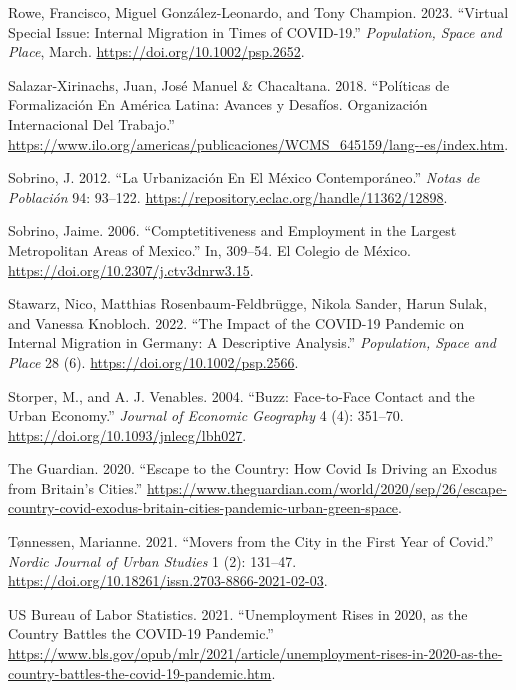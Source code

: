 \documentclass[11pt,letterpaper]{article}
\newlength{\cslhangindent}
\newlength{\cslentryspacingunit} %
\newenvironment{CSLReferences}[2] %
 {%
  \setlength{\parindent}{0pt}
  \ifodd #1
  \let\oldpar\par
  \def\par{\hangindent=\cslhangindent\oldpar}
  \fi
  \setlength{\parskip}{#2\cslentryspacingunit}
 }%
 {}
\begin{document}
\begin{CSLReferences}{1}{0}
\leavevmode{}%
Rowe, Francisco, Miguel González-Leonardo, and Tony Champion. 2023.
{``Virtual Special Issue: Internal Migration in Times of COVID{-}19.''}
\emph{Population, Space and Place}, March.
\url{https://doi.org/10.1002/psp.2652}.

\leavevmode{}%
Salazar-Xirinachs, Juan, José Manuel \& Chacaltana. 2018. {``Políticas
de Formalización En América Latina: Avances y Desafíos. Organización
Internacional Del Trabajo.''}
\url{https://www.ilo.org/americas/publicaciones/WCMS_645159/lang--es/index.htm}.

\leavevmode{}%
Sobrino, J. 2012. {``La Urbanización En El México Contemporáneo.''}
\emph{Notas de Población} 94: 93--122.
\url{https://repository.eclac.org/handle/11362/12898}.

\leavevmode{}%
Sobrino, Jaime. 2006. {``Comptetitiveness and Employment in the Largest
Metropolitan Areas of Mexico.''} In, 309--54. El Colegio de México.
\url{https://doi.org/10.2307/j.ctv3dnrw3.15}.

\leavevmode{}%
Stawarz, Nico, Matthias Rosenbaum-Feldbrügge, Nikola Sander, Harun
Sulak, and Vanessa Knobloch. 2022. {``The Impact of the COVID{-}19
Pandemic on Internal Migration in Germany: A Descriptive Analysis.''}
\emph{Population, Space and Place} 28 (6).
\url{https://doi.org/10.1002/psp.2566}.

\leavevmode{}%
Storper, M., and A. J. Venables. 2004. {``Buzz: Face-to-Face Contact and
the Urban Economy.''} \emph{Journal of Economic Geography} 4 (4):
351--70. \url{https://doi.org/10.1093/jnlecg/lbh027}.

\leavevmode{}%
The Guardian. 2020. {``Escape to the Country: How Covid Is Driving an
Exodus from Britain's Cities.''}
\url{https://www.theguardian.com/world/2020/sep/26/escape-country-covid-exodus-britain-cities-pandemic-urban-green-space}.

\leavevmode{}%
Tønnessen, Marianne. 2021. {``Movers from the City in the First Year of
Covid.''} \emph{Nordic Journal of Urban Studies} 1 (2): 131--47.
\url{https://doi.org/10.18261/issn.2703-8866-2021-02-03}.

\leavevmode{}%
US Bureau of Labor Statistics. 2021. {``Unemployment Rises in 2020, as
the Country Battles the COVID-19 Pandemic.''}
\url{https://www.bls.gov/opub/mlr/2021/article/unemployment-rises-in-2020-as-the-country-battles-the-covid-19-pandemic.htm}.


\end{CSLReferences}
\end{document}

